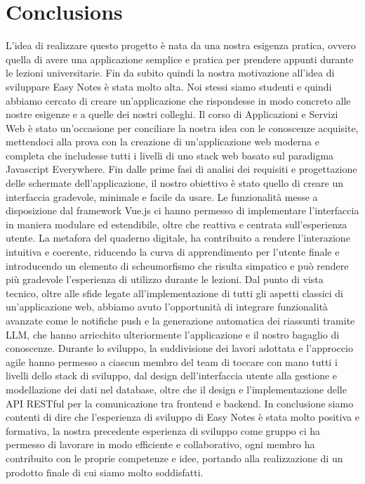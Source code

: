 \chapter{Conclusions}
L'idea di realizzare questo progetto è nata da una nostra esigenza pratica, ovvero quella di avere una applicazione semplice e pratica per prendere appunti durante le lezioni universitarie. Fin da subito quindi la nostra motivazione all'idea di sviluppare Easy Notes è stata molto alta. Noi stessi siamo studenti e quindi abbiamo cercato di creare un'applicazione che rispondesse in modo concreto alle nostre esigenze e a quelle dei nostri colleghi. Il corso di Applicazioni e Servizi Web è stato un'occasione per conciliare la nostra idea con le conoscenze acquisite, mettendoci alla prova con la creazione di un'applicazione web moderna e completa che includesse tutti i livelli di uno stack web basato sul paradigma Javascript Everywhere. Fin dalle prime fasi di analisi dei requisiti e progettazione delle schermate dell'applicazione, il nostro obiettivo è stato quello di creare un interfaccia gradevole, minimale e facile da usare. Le funzionalità messe a disposizione dal framework Vue.js ci hanno permesso di implementare l'interfaccia in maniera modulare ed estendibile, oltre che reattiva e centrata sull'esperienza utente. La metafora del quaderno digitale, ha contribuito a rendere l'interazione intuitiva e coerente, riducendo la curva di apprendimento per l'utente finale e introducendo un elemento di scheumorfismo che risulta simpatico e può rendere più gradevole l'esperienza di utilizzo durante le lezioni. Dal punto di vista tecnico, oltre alle sfide legate all'implementazione di tutti gli aspetti classici di un'applicazione web, abbiamo avuto l'opportunità di integrare funzionalità avanzate come le notifiche push e la generazione automatica dei riassunti tramite LLM, che hanno arricchito ulteriormente l'applicazione e il nostro bagaglio di conoscenze. Durante lo sviluppo, la suddivisione dei lavori adottata e l'approccio agile hanno permesso a ciascun membro del team di toccare con mano tutti i livelli dello stack di sviluppo, dal design dell'interfaccia utente alla gestione e modellazione dei dati nel database, oltre che il design e l'implementazione delle API RESTful per la comunicazione tra frontend e backend. In conclusione siamo contenti di dire che l'esperienza di sviluppo di Easy Notes è stata molto positiva e formativa, la nostra precedente esperienza di sviluppo come gruppo ci ha permesso di lavorare in modo efficiente e collaborativo, ogni membro ha contribuito con le proprie competenze e idee, portando alla realizzazione di un prodotto finale di cui siamo molto soddisfatti. 